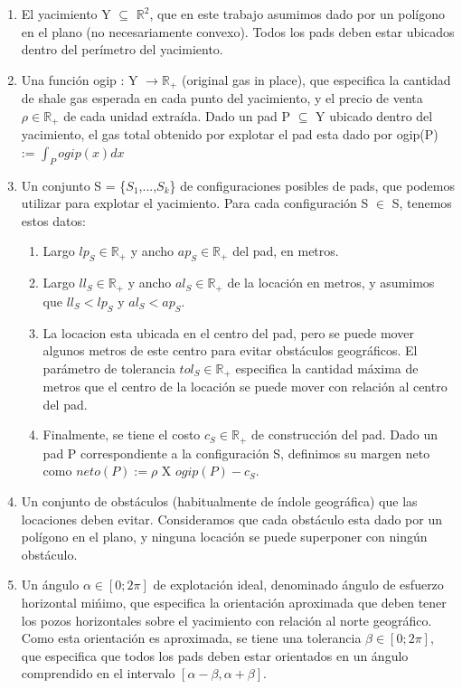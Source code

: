 \begin{enumerate}
\item El yacimiento Y  $\subseteq$ $\mathbb{R}^2$, que en este trabajo asumimos dado por un pol\'igono en el plano (no necesariamente convexo). Todos los pads deben estar ubicados dentro del per\'imetro del yacimiento.
\item Una funci\'on ogip : Y $\rightarrow \mathbb{R}_{+}$ (original gas in place), que especifica la
cantidad de shale gas esperada en cada punto del yacimiento, y el precio
de venta $\rho  \in \mathbb{R}_{+}$ de cada unidad extra\'ida. Dado un pad P $\subseteq$ Y ubicado
dentro del yacimiento, el gas total obtenido por explotar el pad esta dado
por ogip(P) := $\int_{P}^{} ogip(x) dx$
\item Un conjunto S = \{$S_1$,...,$S_k$\} de configuraciones posibles de pads, que
podemos utilizar para explotar el yacimiento. Para cada configuraci\'on S $\in$ S, tenemos estos datos:
\begin{enumerate}
\item  Largo $lp_S \in \mathbb{R}_{+}$ y ancho $ap_S \in \mathbb{R}_{+}$ del pad, en metros.
\item  Largo $ll_S \in \mathbb{R}_{+}$ y ancho $al_S \in \mathbb{R}_{+}$ de la locaci\'on en metros, y asumimos que $ll_S < lp_S$ y $al_S < ap_S$.
\item  La locacion esta ubicada en el centro del pad, pero se puede mover algunos metros de este centro para evitar obst\'aculos geogr\'aficos. El par\'ametro de tolerancia $tol_S \in \mathbb{R}_{+}$ especifica la cantidad m\'axima de metros que el centro de la locaci\'on se puede mover con relaci\'on
al centro del pad.
\item  Finalmente, se tiene el costo $c_S \in \mathbb{R}_{+}$ de construcci\'on del pad.
Dado un pad P correspondiente a la configuraci\'on S, definimos su margen neto como $neto(P) := \rho$ X $ogip(P) - c_S$.
\end{enumerate}
\item  Un conjunto de obst\'aculos (habitualmente de \'indole geogr\'afica) que las locaciones deben evitar. Consideramos que cada obst\'aculo esta dado por un pol\'igono en el plano, y ninguna locaci\'on se puede superponer con ning\'un obst\'aculo.
\item Un \'angulo $\alpha \in [0; 2\pi]$ de explotaci\'on ideal, denominado \'angulo de esfuerzo horizontal mi\'nimo, que especifica la orientaci\'on aproximada que deben tener los pozos horizontales sobre el yacimiento con relaci\'on al norte geogr\'afico. Como esta orientaci\'on es aproximada, se tiene una tolerancia $\beta \in [0; 2\pi]$, que especifica que todos los pads deben estar orientados en un \'angulo comprendido en el intervalo $[\alpha - \beta, \alpha + \beta]$.
\end{enumerate}



